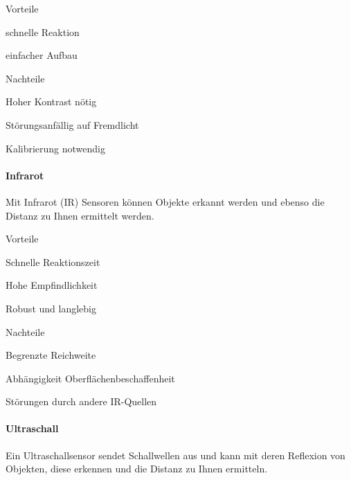\documentclass[../main.tex]{subfiles}
\begin{document}
\begin{minipage}[t]{0.48\textwidth}
\begin{items}
  \item [Vorteile]
  \item schnelle Reaktion
  \item einfacher Aufbau
\end{items}
\end{minipage}
\hfill
\begin{minipage}[t]{0.48\textwidth}
\begin{items}
  \item [Nachteile]
  \item Hoher Kontrast nötig
  \item Störungsanfällig auf Fremdlicht
  \item Kalibrierung notwendig
\end{items}
\end{minipage}

\paragraph{Infrarot}
Mit Infrarot (IR) Sensoren können Objekte erkannt werden und ebenso die Distanz zu Ihnen ermittelt werden.

\begin{minipage}[t]{0.48\textwidth}
\begin{items}
  \item [Vorteile]
  \item Schnelle Reaktionszeit
  \item Hohe Empfindlichkeit
  \item Robust und langlebig
\end{items}
\end{minipage}
\hfill
\begin{minipage}[t]{0.48\textwidth}
\begin{items}
  \item [Nachteile]
  \item Begrenzte Reichweite
  \item Abhängigkeit Oberflächenbeschaffenheit
  \item Störungen durch andere IR-Quellen
\end{items}
\end{minipage}

\paragraph{Ultraschall}
Ein Ultraschallsensor sendet Schallwellen aus und kann mit deren Reflexion von Objekten, diese erkennen und die Distanz zu Ihnen ermitteln.
\end{document}
